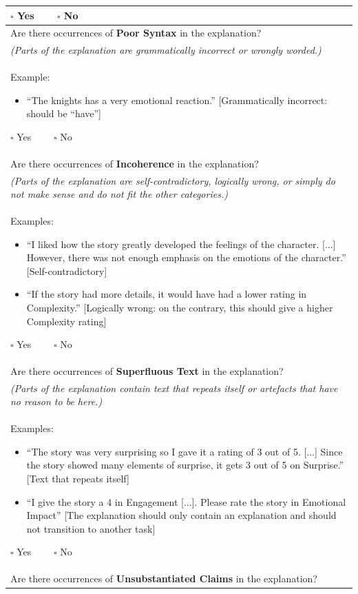 \begin{longtable}[h]{p{}}
$\square$ Yes $\qquad \square$ No\\
\midrule
Are there occurrences of \textbf{Poor Syntax} in the explanation?\\
\textit{(Parts of the explanation are grammatically incorrect or wrongly worded.)}\\
Example:
\begin{itemize}[nolistsep]
    \item “The knights has a very emotional reaction.” [Grammatically incorrect: should be “have”]
\end{itemize}
$\square$ Yes $\qquad \square$ No\\
\midrule
Are there occurrences of \textbf{Incoherence} in the explanation?\\
\textit{(Parts of the explanation are self-contradictory, logically wrong, or simply do not make sense and do not fit the other categories.)}\\
Examples:
\begin{itemize}[nolistsep]
    \item ``I liked how the story greatly developed the feelings of the character. [...] However, there was not enough emphasis on the emotions of the character.'' [Self-contradictory]
    \item ``If the story had more details, it would have had a lower rating in Complexity.'' [Logically wrong: on the contrary, this should give a higher Complexity rating]
\end{itemize}
$\square$ Yes $\qquad \square$ No\\
\midrule
Are there occurrences of \textbf{Superfluous Text} in the explanation?\\
\textit{(Parts of the explanation contain text that repeats itself or artefacts that have no reason to be here.)}\\
Examples:
\begin{itemize}[nolistsep]
    \item ``The story was very surprising so I gave it a rating of 3 out of 5. [...] Since the story showed many elements of surprise, it gets 3 out of 5 on Surprise.'' [Text that repeats itself]
    \item ``I give the story a 4 in Engagement [...]. Please rate the story in Emotional Impact'' [The explanation should only contain an explanation and should not transition to another task]
\end{itemize}
$\square$ Yes $\qquad \square$ No\\
\midrule
Are there occurrences of \textbf{Unsubstantiated Claims} in the explanation?\\

\end{longtable}
